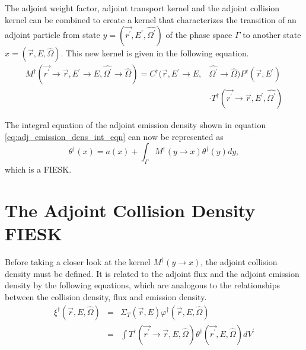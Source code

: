 The adjoint weight factor, adjoint transport kernel and the adjoint collision
kernel can be combined to create a kernel that characterizes the transition of
an adjoint particle from state $y = (\vec{r^{'}},E^{'},\hat{\Omega^{'}})$ of the 
phase space $\Gamma$ to another state $x = (\vec{r},E,\hat{\Omega})$. This new 
kernel is given in the following equation.
\begin{equation}
  \begin{split}
    M^{\dagger}(\vec{r^{'}} \to \vec{r},E^{'} \to E,\hat{\Omega^{'}} \to \hat{\Omega})
    = C^{\dagger}(\vec{r},E^{'} \to E,&\hat{\Omega^{'}} \to \hat{\Omega})
    P^{\dagger}(\vec{r},E^{'}) \\
    & \cdot T^{\dagger}(\vec{r^{'}} \to \vec{r},E^{'},\hat{\Omega^{'}})
  \end{split}
\end{equation}

The integral equation of the adjoint emission density shown in equation 
\ref{eq:adj_emission_dens_int_eqn} can now be represented as
\begin{equation*}
  \theta^{\dagger}(x) = a(x) + \int_{\Gamma}M^{\dagger}(y \to x) \theta^{\dagger}(y)dy,
\end{equation*}
which is a FIESK.

\section{The Adjoint Collision Density FIESK}
Before taking a closer look at the kernel $M^{\dagger}(y \to x)$, the adjoint
collision density must be defined. It is related to the adjoint flux and the
adjoint emission density by the following equations, which are analogous to
the relationships between the collision density, flux and emission density.
\begin{eqnarray}
  \xi^{\dagger}(\vec{r},E,\hat{\Omega}) & = & \Sigma_T(\vec{r},E)
  \varphi^{\dagger}(\vec{r},E,\hat{\Omega}) \\
  & = & \int T^{\dagger}(\vec{r^{'}} \to \vec{r},E,\hat{\Omega})
  \theta^{\dagger}(\vec{r^{'}},E,\hat{\Omega}) dV^{'}
  \label{eq:adj_collision_dens_to_adj_emission_dens}
\end{eqnarray}

